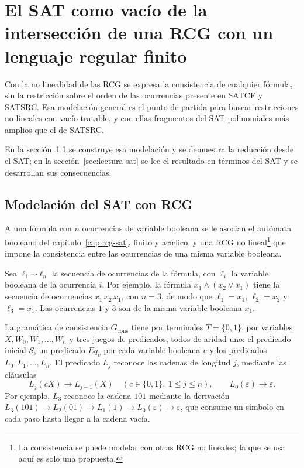 \documentclass{report}
\theoremstyle{definition}
\theoremstyle{plain}
\begin{document}
\setcounter{chapter}{3}
\chapter{El SAT como vacío de la intersección de una RCG con un lenguaje regular finito}
\label{cap:modelacion-sat}

Con la no linealidad de
las RCG se expresa la consistencia de cualquier fórmula, sin la
restricción sobre el orden de las ocurrencias presente en SATCF y
SATSRC. Esa modelación general es el punto de partida para buscar
restricciones no lineales con vacío tratable, y con ellas fragmentos
del SAT polinomiales más amplios que el de SATSRC.

En la sección~\ref{sec:modelacion-sat} se construye esa modelación y se
demuestra la reducción desde el SAT; en la sección~\ref{sec:lectura-sat} se lee
el resultado en términos del SAT y se desarrollan sus consecuencias.

\section{Modelación del SAT con RCG}
\label{sec:modelacion-sat}

A
una fórmula con $n$ ocurrencias de variable booleana se le asocian el autómata
booleano del capítulo~\ref{cap:rcg-sat}, finito y acíclico, y una RCG no
lineal\footnote{La consistencia se puede modelar con otras RCG no lineales; la que se
usa aquí es solo una propuesta.} que impone la consistencia entre las
ocurrencias de una misma variable booleana.

Sea $\ell_1\cdots\ell_n$ la secuencia de ocurrencias de la fórmula, con
$\ell_i$ la variable booleana de la ocurrencia $i$. Por ejemplo, la fórmula
$x_1 \wedge (x_2 \vee x_1)$ tiene la secuencia de ocurrencias
$x_1\,x_2\,x_1$, con $n = 3$, de modo que $\ell_1 = x_1$, $\ell_2 = x_2$
y $\ell_3 = x_1$. Las ocurrencias $1$ y $3$ son de la misma variable booleana
$x_1$.

La gramática de consistencia
$G_{\mathrm{cons}}$ tiene por terminales $T=\{0,1\}$, por variables
$X, W_0, W_1, \ldots, W_n$ y tres juegos de predicados, todos de
aridad uno: el predicado inicial $S$, un predicado $Eq_v$ por cada
variable booleana $v$ y los predicados $L_0, L_1, \ldots, L_n$. El
predicado $L_j$ reconoce las cadenas de longitud $j$, mediante las
cláusulas
\[
  L_j(cX) \to L_{j-1}(X) \quad (c \in \{0,1\},\ 1 \le j \le n),
  \qquad L_0(\varepsilon) \to \varepsilon.
\]
Por ejemplo, $L_3$ reconoce la cadena $101$ mediante la derivación
$L_3(101) \to L_2(01) \to L_1(1) \to L_0(\varepsilon) \to \varepsilon$,
que consume un símbolo en cada paso hasta llegar a la cadena vacía.
\end{document}
